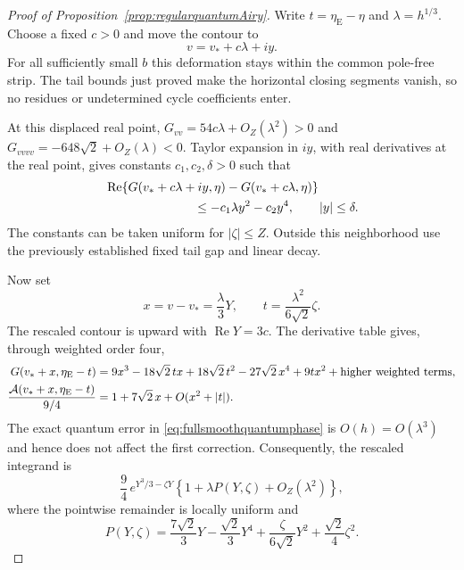 \documentclass[11pt,a4paper]{article}
\numberwithin{equation}{section}
\theoremstyle{definition}
\theoremstyle{remark}
\begin{document}
\begin{proof}[Proof of Proposition~\ref{prop:regularquantumAiry}]
Write $t=\eta_{\mathrm E}-\eta$ and $\lambda=h^{1/3}$.
Choose a fixed $c>0$ and move the contour to
\[
 v=v_*+c\lambda+iy.
\]
For all sufficiently small $b$ this deformation stays within
the common pole-free strip. The tail bounds just proved make
the horizontal closing segments vanish, so no residues or
undetermined cycle coefficients enter.

At this displaced real point,
$G_{vv}=54c\lambda+O_Z(\lambda^2)>0$ and
$G_{vvvv}=-648\sqrt2+O_Z(\lambda)<0$.
Taylor expansion in $iy$, with real derivatives at the real
point, gives constants $c_1,c_2,\delta>0$ such that
\begin{equation}
 \begin{split}
 &\operatorname{Re}\{G(v_*+c\lambda+iy,\eta)
                     -G(v_*+c\lambda,\eta)\}\\
 &\hspace{25mm}\le -c_1\lambda y^2-c_2y^4,
       \qquad |y|\le\delta.
 \end{split}
 \label{eq:AiryGaussianbound}
\end{equation}
The constants can be taken uniform for $|\zeta|\le Z$.
Outside this neighborhood use the previously established
fixed tail gap and linear decay.

Now set
\[
 x=v-v_*=\frac{\lambda}{3}Y,\qquad
 t=\frac{\lambda^2}{6\sqrt2}\zeta.
\]
The rescaled contour is upward with $\operatorname{Re}Y=3c$.
The derivative table gives, through weighted order four,
\begin{align}
 G(v_*+x,\eta_{\mathrm E}-t)
 &=9x^3-18\sqrt2\,tx
   +18\sqrt2\,t^2-27\sqrt2\,x^4+9tx^2
   +\text{higher weighted terms},\notag\\
 \frac{\mathcal A(v_*+x,\eta_{\mathrm E}-t)}{9/4}
 &=1+7\sqrt2\,x+O(x^2+|t|).
 \label{eq:Airyweightedexpansion}
\end{align}
The exact quantum error in
\eqref{eq:fullsmoothquantumphase} is $O(h)=O(\lambda^3)$
and hence does not affect the first correction.
Consequently, the rescaled integrand is
\begin{equation}
 \frac94\,e^{Y^3/3-\zeta Y}
 \left\{1+\lambda P(Y,\zeta)+O_Z(\lambda^2)\right\},
 \label{eq:Airyscaledquantum}
\end{equation}
where the pointwise remainder is locally uniform and
\begin{equation}
 P(Y,\zeta)=
 \frac{7\sqrt2}{3}Y-\frac{\sqrt2}{3}Y^4
 +\frac{\zeta}{6\sqrt2}Y^2
 +\frac{\sqrt2}{4}\zeta^2.
 \label{eq:Airycorrectionpolynomial}
\end{equation}


\end{proof}
\end{document}

